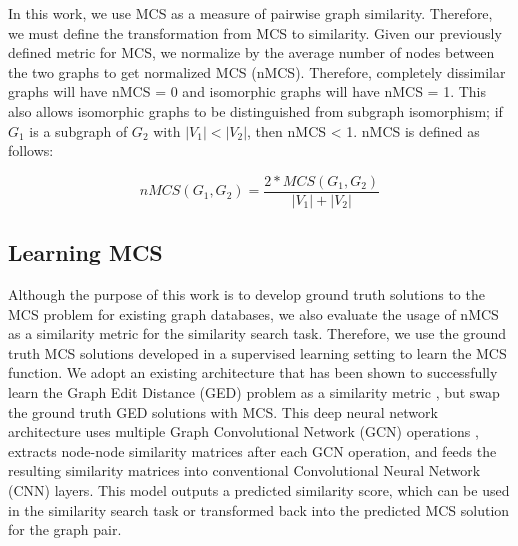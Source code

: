 In this work, we use MCS as a measure of pairwise graph similarity. Therefore, we must define the transformation from MCS to similarity. Given our previously defined metric for MCS, we normalize by the average number of nodes between the two graphs to get normalized MCS (nMCS). Therefore, completely dissimilar graphs will have nMCS = 0 and isomorphic graphs will have nMCS = 1. This also allows isomorphic graphs to be distinguished from subgraph isomorphism; if $G_1$ is a subgraph of $G_2$ with $|V_1| < |V_2|$, then nMCS < 1. nMCS is defined as follows:

$$ nMCS(G_1, G_2) = \frac{2 * MCS(G_1, G_2)}{|V_1| + |V_2|} $$



\subsection{Learning MCS}
Although the purpose of this work is to develop ground truth solutions to the MCS problem for existing graph databases, we also evaluate the usage of nMCS as a similarity metric for the similarity search task. Therefore, we use the ground truth MCS solutions developed in a supervised learning setting to learn the MCS function. We adopt an existing architecture that has been shown to successfully learn the Graph Edit Distance (GED) problem as a similarity metric \cite{bai2018convolutional}, but swap the ground truth GED solutions with MCS. This deep neural network architecture uses multiple Graph Convolutional Network (GCN) operations \cite{kipf2016semi}, extracts node-node similarity matrices after each GCN operation, and feeds the resulting similarity matrices into conventional Convolutional Neural Network (CNN) layers. This model outputs a predicted similarity score, which can be used in the similarity search task or transformed back into the predicted MCS solution for the graph pair.
